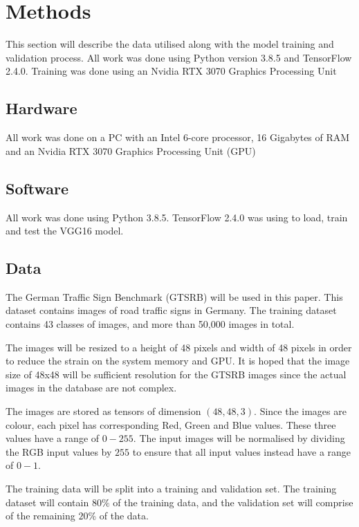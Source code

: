 \documentclass[a4paper,11pt]{article}
\begin{document}

\section{Methods}

This section will describe the data utilised along with the model training and validation process. All work was done using Python version 3.8.5 and TensorFlow 2.4.0. Training was done using an Nvidia RTX 3070 Graphics Processing Unit

\subsection{Hardware}

All work was done on a PC with an Intel 6-core processor, 16 Gigabytes of RAM and an Nvidia RTX 3070 Graphics Processing Unit (GPU)

\subsection{Software}

All work was done using Python 3.8.5. TensorFlow 2.4.0 was using to load, train and test the VGG16 model.

\subsection{Data}

The German Traffic Sign Benchmark (GTSRB) will be used in this paper. This dataset contains images of road traffic signs in Germany. The training dataset contains 43 classes of images, and more than 50,000 images in total. 

The images will be resized to a height of 48 pixels and width of 48 pixels in order to reduce the strain on the system memory and GPU. It is hoped that the image size of 48x48 will be sufficient resolution for the GTSRB images since the actual images in the database are not complex.

The images are stored as tensors of dimension $(48, 48, 3)$. Since the images are colour, each pixel has corresponding Red, Green and Blue values. These three values have a range of $0-255$. The input images will be normalised by dividing the RGB input values by $255$ to ensure that all input values instead have a range of $0-1$.

The training data will be split into a training and validation set. The training dataset will contain $80\%$ of the training data, and the validation set will comprise of the remaining $20\%$ of the data.
\end{document}

